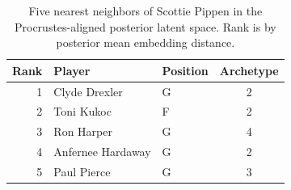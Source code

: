 \begin{table}[htbp]
  \centering\small
  \begin{tabular}{rllc}
    \toprule
    Rank & Player & Position & Archetype \\
    \midrule
    1 & Clyde Drexler & G & 2 \\
    2 & Toni Kukoc & F & 2 \\
    3 & Ron Harper & G & 4 \\
    4 & Anfernee Hardaway & G & 2 \\
    5 & Paul Pierce & G & 3 \\
    \bottomrule
  \end{tabular}
  \caption{Five nearest neighbors of Scottie Pippen in the Procrustes-aligned posterior latent space. Rank is by posterior mean embedding distance.}
  \label{tab:Scottie_Pippen_neighbors}
\end{table}

